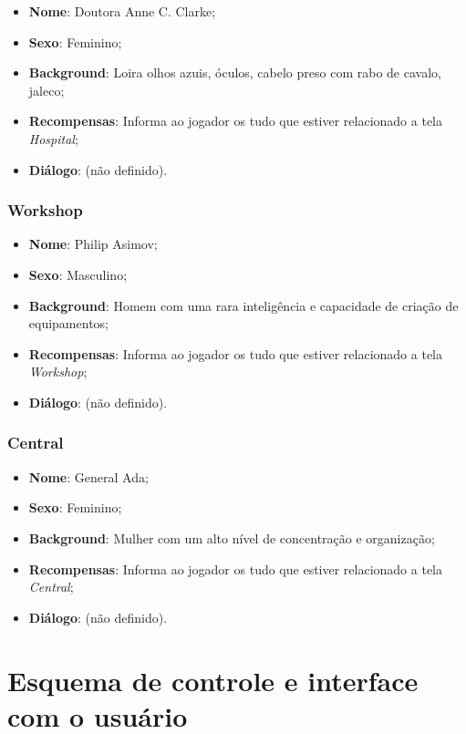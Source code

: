 \documentclass[11pt]{article} %
\begin{document}
\begin{itemize}
  \item \textbf{Nome}: Doutora Anne C. Clarke;
  \item \textbf{Sexo}: Feminino;
  \item \textbf{Background}: Loira olhos azuis, óculos, cabelo preso com rabo de cavalo, jaleco;
  \item \textbf{Recompensas}: Informa ao jogador os tudo que estiver relacionado a tela \textit{Hospital};
  \item \textbf{Diálogo}: (não definido).
\end{itemize}

\subsubsection{Workshop}

\begin{itemize}
  \item \textbf{Nome}: Philip Asimov;
  \item \textbf{Sexo}: Masculino;
  \item \textbf{Background}: Homem com uma rara inteligência e capacidade de criação de equipamentos;
  \item \textbf{Recompensas}: Informa ao jogador os tudo que estiver relacionado a tela \textit{Workshop};
  \item \textbf{Diálogo}: (não definido).
\end{itemize}

\subsubsection{Central}

\begin{itemize}
  \item \textbf{Nome}: General Ada;
  \item \textbf{Sexo}: Feminino;
  \item \textbf{Background}: Mulher com um alto nível de concentração e organização;
  \item \textbf{Recompensas}: Informa ao jogador os tudo que estiver relacionado a tela \textit{Central};
  \item \textbf{Diálogo}: (não definido).
\end{itemize}

\section{Esquema de controle e interface com o usuário}
\end{document}
